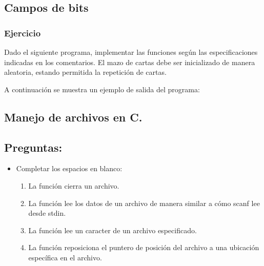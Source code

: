\subsection*{Campos de bits}
\subsubsection{Ejercicio}
Dado el siguiente programa, implementar las funciones según las especificaciones indicadas en los comentarios.
El mazo de cartas debe ser inicializado de manera aleatoria, estando permitida la repetición de cartas.
\lstset{inputencoding=utf8/latin1}

A continuación se muestra un ejemplo de salida del programa:
\lstset{inputencoding=utf8/latin1}
{\small

}

\subsection*{Manejo de archivos en C.}

\subsection{Preguntas:}
\begin{itemize}[a)]
  \item Completar los espacios en blanco:\\
    \begin{enumerate}
      \item La función \underspace cierra un archivo.
      \item La función \underspace lee los datos de un archivo de manera similar a cómo scanf lee desde stdin.
      \item La función \underspace lee un caracter de un archivo especificado.
      \item La función \underspace reposiciona el puntero de posición del archivo a una ubicación específica en el archivo.
    \end{enumerate}
\end{itemize}
